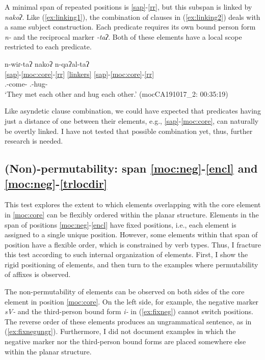 \documentclass[output=paper]{langscibook}
\begin{document}
A minimal span of repeated positions is \ref{sap}-\ref{rr}, but this subspan is linked by \textit{nakoʔ}. Like (\ref{ex:linking1}), the combination of clauses in (\ref{ex:linking2}) deals with a same subject construction. Each predicate requires its own bound person form \textit{n-} and the reciprocal marker \textit{-taʔ}. Both of these elements have a local scope restricted to each predicate.  

\ea \label{ex:linking2}
\glll n-wiɾ-taʔ nakoʔ n-qaʔal-taʔ\\
\ref{sap}-\ref{moc:core}-\ref{rr} \ref{linkers} \ref{sap}-\ref{moc:core}-\ref{rr}\\
    {\Third.\III}-come-{\Recp} {\LinkOne} {\Third.\III}-hug-{\Recp}\\
     \glt `They met each other and hug each other.' \hfill (mocCA191017\_2: 00:35:19)
\z

Like asyndetic clause combination, we could have expected that predicates having just a distance of one between their elements, e.g., \ref{sap}-\ref{moc:core}, can naturally be overtly linked. I have not tested that possible combination yet, thus, further research is needed. 


\subsection{(Non)-permutability: span \ref{moc:neg}-\ref{encl} and \ref{moc:neg}-\ref{trlocdir}} \label{sec:nonperm}
This test explores the extent to which elements overlapping with the core element in \ref{moc:core}  can be flexibly ordered within the planar structure.  Elements in the span of positions \ref{moc:neg}-\ref{encl} have fixed positions, i.e., each element is assigned to a single unique position. However, some elements within that span of position have a flexible order, which is constrained by verb types. Thus, I fracture this test  according to such internal organization of elements. First, I show the rigid positioning of elements, and then turn to the examples where permutability of affixes is observed. %

The non-permutability of elements can be observed on both sides of the core element in position \ref{moc:core}. On the left side, for example, the negative marker \textit{sV-} and the third-person bound form \textit{i-} in (\ref{ex:fixneg}) cannot switch positions. The reverse order of these elements produces an ungrammatical sentence, as in  (\ref{ex:fixnegungr}). Furthermore, I did not document examples in which the negative marker nor the third-person bound forms are placed somewhere else within the planar structure.
\end{document}
